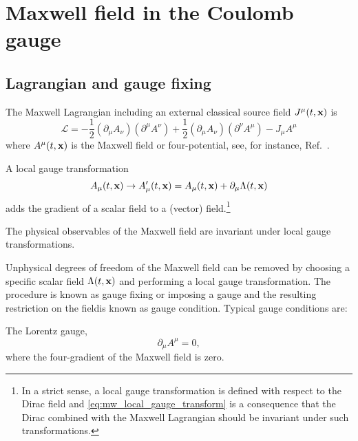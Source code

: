 \section{Maxwell field in the Coulomb gauge}

\subsection{Lagrangian and gauge fixing}

\begin{definition}
	The Maxwell Lagrangian including an external classical source field $J^\mu(t,\vb{x})$ is
	\begin{equation}
		\mathcal{L}
		=
		-
		\frac{1}{2}
		(\partial_\mu A_\nu)
		(\partial^\mu A^\nu)
		+
		\frac{1}{2}
		(\partial_\mu A_\nu)
		(\partial^\nu A^\mu)
		-
		J_\mu A^\mu
		\label{eq:mw_lagrangian}
	\end{equation}
	where $A^\mu(t,\vb{x})$ is the Maxwell field or four-potential, see, for instance, Ref.~\cite[p.~339]{Srednicki2007}.
\end{definition}
\begin{definition}
	A local gauge transformation
	\begin{equation}
		A_\mu(t,\vb{x})
		\to
		A_\mu^\prime(t,\vb{x})
		=
		A_\mu(t,\vb{x})
		+
		\partial_\mu\Lambda(t,\vb{x})
		\label{eq:mw_local_gauge_transform}
	\end{equation}
	adds the gradient of a scalar field to a (vector) field.\footnote{In a strict sense, a local gauge transformation is defined with respect to the Dirac field and \cref{eq:mw_local_gauge_transform} is a consequence that the Dirac combined with the Maxwell Lagrangian should be invariant under such transformations.}
\end{definition}
\begin{theorem}\label{thm:mw_local_gauge_invariance}
	The physical observables of the Maxwell field are invariant under local gauge transformations.
\end{theorem}
Unphysical degrees of freedom of the Maxwell field can be removed by choosing a specific scalar field $\Lambda(t,\vb{x})$ and performing a local gauge transformation.
The procedure is known as gauge fixing or imposing a gauge and the resulting restriction on the fieldis known as gauge condition.
Typical gauge conditions are:
\begin{definition}
	The Lorentz gauge,
	\begin{equation}
		\partial_\mu
		A^\mu
		=
		0
		,
	\end{equation}
	where the four-gradient of the Maxwell field is zero.
\end{definition}
